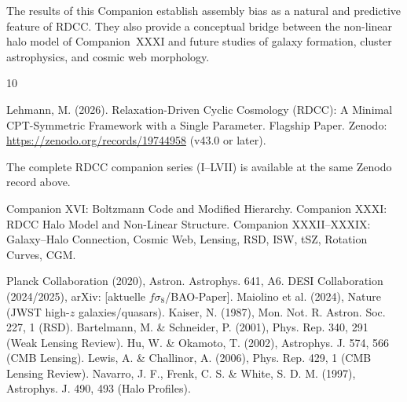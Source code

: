 \documentclass[11pt,a4paper]{article}
\begin{document}
The results of this Companion establish assembly bias as a natural and predictive 
feature of RDCC. They also provide a conceptual bridge between the non-linear halo 
model of Companion~XXXI and future studies of galaxy formation, cluster astrophysics, 
and cosmic web morphology.


\begin{thebibliography}{10}

 Lehmann, M. (2026). Relaxation-Driven Cyclic Cosmology (RDCC): A Minimal CPT-Symmetric Framework with a Single Parameter. Flagship Paper. Zenodo: \url{https://zenodo.org/records/19744958} (v43.0 or later).

 The complete RDCC companion series (I--LVII) is available at the same Zenodo record above.

 Companion XVI: Boltzmann Code and Modified Hierarchy.
 Companion XXXI: RDCC Halo Model and Non-Linear Structure.
 Companion XXXII--XXXIX: Galaxy--Halo Connection, Cosmic Web, Lensing, RSD, ISW, tSZ, Rotation Curves, CGM.

 Planck Collaboration (2020), Astron. Astrophys. 641, A6.
 DESI Collaboration (2024/2025), arXiv: [aktuelle $f\sigma_8$/BAO-Paper].
 Maiolino et al. (2024), Nature (JWST high-$z$ galaxies/quasars).
 Kaiser, N. (1987), Mon. Not. R. Astron. Soc. 227, 1 (RSD).
 Bartelmann, M. \& Schneider, P. (2001), Phys. Rep. 340, 291 (Weak Lensing Review).
 Hu, W. \& Okamoto, T. (2002), Astrophys. J. 574, 566 (CMB Lensing).
 Lewis, A. \& Challinor, A. (2006), Phys. Rep. 429, 1 (CMB Lensing Review).
 Navarro, J. F., Frenk, C. S. \& White, S. D. M. (1997), Astrophys. J. 490, 493 (Halo Profiles).

\end{thebibliography}
\end{document}
